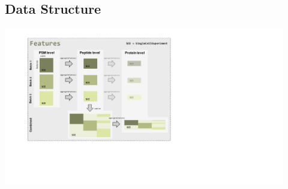\documentclass{article}
\begin{document}
\begin{multicols}{2}
\noindent
\begin{minipage}[t]{\linewidth}
  \vspace{0.55cm}
  \section*{\huge Data Structure}
  \begin{center}
    \includegraphics[width=0.92\textwidth, trim={2.6cm 5cm 13.7cm 1cm},clip]{figs/Features.pdf}
  \end{center}
\end{minipage}


\noindent
\begin{minipage}[t]{\linewidth}
  \vspace{0.55cm}

\end{minipage}
\end{multicols}
\end{document}
